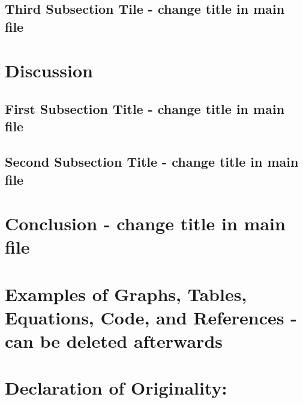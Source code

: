 \documentclass[12pt]{article}
\begin{document}
\begin{spacing}{1.5}
\subsection{Third Subsection Tile - change title in main file}


\newpage
\bigskip

\section{Discussion}

\subsection{First Subsection Title - change title in main file}

\subsection{Second Subsection Title - change title in main file}


\newpage


\section{Conclusion - change title in main file}



\section{Examples of Graphs, Tables, Equations, Code, and References - can be deleted afterwards}



\newpage
{}



\newpage
\thispagestyle{empty}
\section*{Declaration of Originality:}


\end{spacing}
\end{document}
